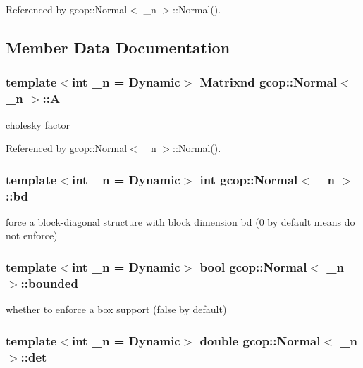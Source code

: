 \-Referenced by gcop\-::\-Normal$<$ \-\_\-n $>$\-::\-Normal().



\subsection{\-Member \-Data \-Documentation}
\subsubsection[{\-A}]{\setlength{\rightskip}{0pt plus 5cm}template$<$int \-\_\-n = \-Dynamic$>$ {\bf \-Matrixnd} {\bf gcop\-::\-Normal}$<$ \-\_\-n $>$\-::{\bf \-A}}\label{classgcop_1_1Normal_abdb1b9190569775b30fc202be40ccef3}


cholesky factor 



\-Referenced by gcop\-::\-Normal$<$ \-\_\-n $>$\-::\-Normal().

\subsubsection[{bd}]{\setlength{\rightskip}{0pt plus 5cm}template$<$int \-\_\-n = \-Dynamic$>$ int {\bf gcop\-::\-Normal}$<$ \-\_\-n $>$\-::{\bf bd}}\label{classgcop_1_1Normal_a7f1a5099950d5e0fc7a71f97e4d03202}


force a block-\/diagonal structure with block dimension bd (0 by default means do not enforce) 

\subsubsection[{bounded}]{\setlength{\rightskip}{0pt plus 5cm}template$<$int \-\_\-n = \-Dynamic$>$ bool {\bf gcop\-::\-Normal}$<$ \-\_\-n $>$\-::{\bf bounded}}\label{classgcop_1_1Normal_a4c19211ddded224e7fc9a1e687cd4a0e}


whether to enforce a box support (false by default) 

\subsubsection[{det}]{\setlength{\rightskip}{0pt plus 5cm}template$<$int \-\_\-n = \-Dynamic$>$ double {\bf gcop\-::\-Normal}$<$ \-\_\-n $>$\-::{\bf det}}\label{classgcop_1_1Normal_a3002ef044ffb2b63e8d371505ea0d6e0}


